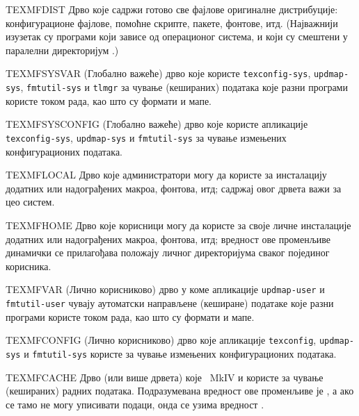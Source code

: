 \documentclass{article}
\begin{document}
\begin{ttdescription}
\item [TEXMFDIST] Дрво које садржи готово све фајлове оригиналне
  дистрибуције: конфигурационе фајлове, помоћне скрипте, пакете,
  фонтове, итд. (Најважнији изузетак су програми који зависе од
  операционог система, и који су смештени у паралелни директоријум
  .)
\item [TEXMFSYSVAR] (Глобално важеће) дрво које користе
  \verb+texconfig-sys+, \verb+updmap-sys+, \verb+fmtutil-sys+ и
  \verb+tlmgr+ за чување (кешираних) података које разни програми
  користе током рада, као што су формати и мапе.
\item [TEXMFSYSCONFIG] (Глобално важеће) дрво које користе апликације
  \verb+texconfig-sys+, \verb+updmap-sys+ и \verb+fmtutil-sys+ за
  чување измењених конфигурационих података.
\item [TEXMFLOCAL] Дрво које администратори могу да користе за
  инсталацију додатних или надограђених макроа, фонтова, итд; садржај
  овог дрвета важи за цео систем.
\item [TEXMFHOME] Дрво које корисници могу да користе за своје личне
  инсталације додатних или надограђених макроа, фонтова, итд; вредност
  ове променљиве динамички се прилагођава положају личног директоријума
  сваког појединог корисника.
\item [TEXMFVAR] (Лично корисниково) дрво у коме апликације
  \verb+updmap-user+ и \verb+fmtutil-user+ чувају
  аутоматски направљене (кеширане) податаке које разни
  програми користе током рада, као што су формати и мапе.
\item [TEXMFCONFIG] (Лично корисниково) дрво које апликације
  \verb+texconfig+, \verb+updmap-sys+ и \verb+fmtutil-sys+ користе за чување
  измењених конфигурационих података.
\item [TEXMFCACHE] Дрво (или више дрвета) које \ConTeXt\ MkIV и
  \LuaLaTeX{} користе за чување (кешираних) радних података.
  Подразумевана вредност ове променљиве је , а ако
  се тамо не могу уписивати подаци, онда се узима вредност
  .
\end{ttdescription}
\end{document}
